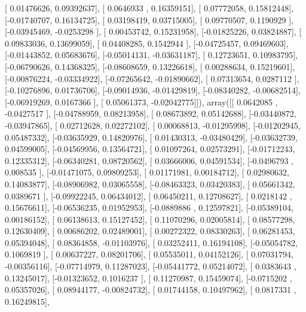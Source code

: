 \documentclass{article}
\begin{document}
       [ 0.01476626,  0.09392637],
       [ 0.0646933 ,  0.16359151],
       [ 0.07772058,  0.15812448],
       [-0.01740707,  0.16134725],
       [ 0.03198419,  0.03715005],
       [ 0.09770507,  0.1190929 ],
       [-0.03945469, -0.0253298 ],
       [ 0.00453742,  0.15231958],
       [-0.01825226,  0.03824887],
       [ 0.09833036,  0.13699059],
       [ 0.04408285,  0.1542944 ],
       [-0.04725457,  0.09469603],
       [-0.01443852,  0.05683676],
       [-0.05014131, -0.03631187],
       [ 0.12723651,  0.10983795],
       [-0.06790626,  0.14368325],
       [-0.08608659,  0.13226618],
       [ 0.00288634,  0.15219601],
       [-0.00876224, -0.03334922],
       [-0.07265642, -0.01890662],
       [ 0.07313654,  0.0287112 ],
       [-0.10276896,  0.01736706],
       [-0.09014936, -0.01429819],
       [-0.08340282, -0.00682514],
       [-0.06919269,  0.0167366 ],
       [ 0.05061373, -0.02042775]]), array([[ 0.0642085 , -0.0427517 ],
       [-0.04788959,  0.08213958],
       [ 0.08673892,  0.05142688],
       [-0.03440872, -0.03947865],
       [ 0.02712628,  0.02272102],
       [ 0.00068813, -0.01295998],
       [-0.01202945,  0.05487332],
       [-0.03635929,  0.14820976],
       [ 0.01430313, -0.03480429],
       [-0.03632739,  0.04599005],
       [-0.04569956,  0.13564721],
       [ 0.01097264,  0.02573291],
       [-0.01712243,  0.12335312],
       [-0.06340281,  0.08720562],
       [ 0.03666006,  0.04591534],
       [-0.0496793 ,  0.008535  ],
       [-0.01471075,  0.09809253],
       [ 0.01171981,  0.00184712],
       [ 0.02980632,  0.14083877],
       [-0.08906982,  0.03065558],
       [-0.08463323,  0.03420383],
       [ 0.05661342,  0.0389671 ],
       [-0.09922245,  0.06434012],
       [ 0.06450211,  0.12708627],
       [ 0.0218142 ,  0.15676611],
       [-0.06536235,  0.01952953],
       [-0.0889886 ,  0.12597821],
       [-0.05389104,  0.00186152],
       [ 0.06138613,  0.15127452],
       [ 0.11070296,  0.02005814],
       [ 0.08577298,  0.12630409],
       [ 0.00686202,  0.02489001],
       [ 0.00272322,  0.08330263],
       [ 0.06281453,  0.05394048],
       [ 0.08364858, -0.01103976],
       [ 0.03252411,  0.16194108],
       [-0.05054782,  0.1069819 ],
       [ 0.00637227,  0.08201706],
       [ 0.05535011,  0.04152126],
       [ 0.07031794, -0.00356116],
       [-0.07714979,  0.11287023],
       [-0.05441772,  0.05214072],
       [ 0.0383643 ,  0.13245017],
       [-0.01323652,  0.1016237 ],
       [ 0.11270987,  0.15459074],
       [-0.0715202 ,  0.05357026],
       [ 0.08944177, -0.00824732],
       [ 0.01744158,  0.10497962],
       [ 0.0817331 ,  0.16249815],
\end{document}
